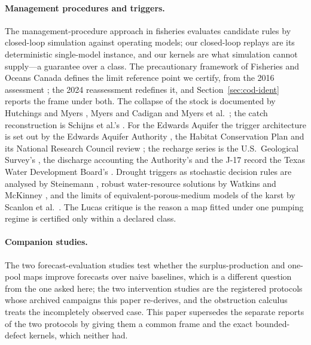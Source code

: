 \documentclass[11pt,a4paper]{article}
\theoremstyle{plain}
\theoremstyle{definition}
\theoremstyle{remark}
\begin{document}
\paragraph{Management procedures and triggers.}
The management-procedure approach in fisheries \cite{Butterworth2007,Punt2016} evaluates candidate rules by closed-loop simulation against operating models; our closed-loop replays are its deterministic single-model instance, and our kernels are what simulation cannot supply---a guarantee over a class. The precautionary framework of Fisheries and Oceans Canada \cite{DFO2009} defines the limit reference point we certify, from the 2016 assessment \cite{DFO2016}; the 2024 reassessment \cite{Regular2025} redefines it, and Section~\ref{sec:cod-ident} reports the frame under both. The collapse of the stock is documented by Hutchings and Myers \cite{Hutchings1994}, Myers and Cadigan \cite{Myers1995} and Myers et al.\ \cite{Myers1997}; the catch reconstruction is Schijns et al.'s \cite{Schijns2021}. For the Edwards Aquifer the trigger architecture is set out by the Edwards Aquifer Authority \cite{EAA2024}, the Habitat Conservation Plan \cite{EARIP2021} and its National Research Council review \cite{NRC2015}; the recharge series is the U.S.\ Geological Survey's \cite{Umphres2025,Puente1978}, the discharge accounting the Authority's \cite{EAA2023} and the J-17 record the Texas Water Development Board's \cite{TWDB}. Drought triggers as stochastic decision rules are analysed by Steinemann \cite{Steinemann2003}, robust water-resource solutions by Watkins and McKinney \cite{Watkins1997}, and the limits of equivalent-porous-medium models of the karst by Scanlon et al.\ \cite{Scanlon2003}. The Lucas critique \cite{Lucas1976} is the reason a map fitted under one pumping regime is certified only within a declared class.

\paragraph{Companion studies.}
The two forecast-evaluation studies \cite{Abaee2026codforecast,Abaee2026edwforecast} test whether the surplus-production and one-pool maps improve forecasts over naive baselines, which is a different question from the one asked here; the two intervention studies \cite{Abaee2026codintervention,Abaee2026edwintervention} are the registered protocols whose archived campaigns this paper re-derives, and the obstruction calculus \cite{Abaee2026obstruction} treats the incompletely observed case. This paper supersedes the separate reports of the two protocols by giving them a common frame and the exact bounded-defect kernels, which neither had.
\end{document}
